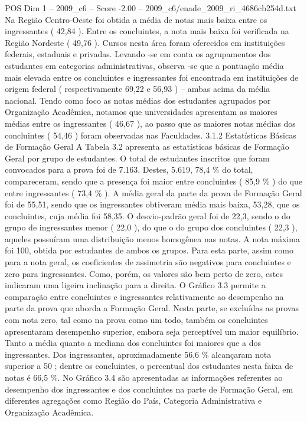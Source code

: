 \begin{textsample}{POS Dim 1 – 2009\_c6 – Score -2.00 – 2009\_c6/enade\_2009\_ri\_4686cb254d.txt}
Na Região Centro-Oeste foi obtida a média de notas mais baixa entre os ingressantes ( 42,84 ).
Entre os concluintes, a nota mais baixa foi verificada na Região Nordeste ( 49,76 ).
Cursos nesta área foram oferecidos em instituições federais, estaduais e privadas.
Levando -se em conta os agrupamentos dos estudantes em categorias administrativas, observa -se que a pontuação média mais elevada entre os concluintes e ingressantes foi encontrada em instituições de origem federal ( respectivamente 69,22 e 56,93 ) – ambas acima da média nacional.
Tendo como foco as notas médias dos estudantes agrupados por Organização Acadêmica, notamos que universidades apresentam as maiores médias entre os ingressantes ( 46,67 ), ao passo que as maiores notas médias dos concluintes ( 54,46 ) foram observadas nas Faculdades. 3.1.2 Estatísticas Básicas de Formação Geral A Tabela 3.2 apresenta as estatísticas básicas de Formação Geral por grupo de estudantes.
O total de estudantes inscritos que foram convocados para a prova foi de 7.163.
Destes, 5.619, 78,4 \% do total, compareceram, sendo que a presença foi maior entre concluintes ( 85,9 \% ) do que entre ingressantes ( 73,4 \% ).
A média geral da parte da prova de Formação Geral foi de 55,51, sendo que os ingressantes obtiveram média mais baixa, 53,28, que os concluintes, cuja média foi 58,35.
O desvio-padrão geral foi de 22,3, sendo o do grupo de ingressantes menor ( 22,0 ), do que o do grupo dos concluintes ( 22,3 ), aqueles possuíram uma distribuição menos homogênea nas notas.
A nota máxima foi 100, obtida por estudantes de ambos os grupos.
Para esta parte, assim como para a nota geral, os coeficientes de assimetria são negativos para concluintes e zero para ingressantes.
Como, porém, os valores são bem perto de zero, estes indicaram uma ligeira inclinação para a direita.
O Gráfico 3.3 permite a comparação entre concluintes e ingressantes relativamente ao desempenho na parte da prova que aborda a Formação Geral.
Nesta parte, se excluídas as provas com nota zero, tal como na prova como um todo, também os concluintes apresentaram desempenho superior, embora seja perceptível um maior equilíbrio.
Tanto a média quanto a mediana dos concluintes foi maiores que a dos ingressantes.
Dos ingressantes, aproximadamente 56,6 \% alcançaram nota superior a 50 ; dentre os concluintes, o percentual dos estudantes nesta faixa de notas é 66,5 \%.
No Gráfico 3.4 são apresentadas as informações referentes ao desempenho dos ingressantes e dos concluintes na parte de Formação Geral, em diferentes agregações como Região do País, Categoria Administrativa e Organização Acadêmica.

\end{textsample}

